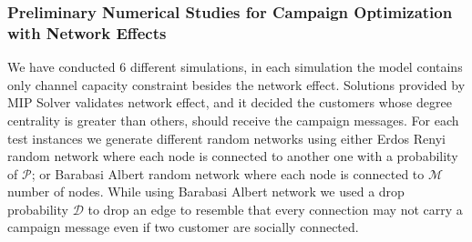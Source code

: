 \documentclass[11pt]{article}
\begin{document}
\subsubsection{Preliminary Numerical Studies for Campaign Optimization with Network Effects}
We have conducted 6 different simulations, in each simulation the model contains only channel capacity constraint besides the network effect. Solutions provided by MIP Solver validates network effect, and it decided the customers whose degree centrality is greater than others, should receive the campaign messages. For each test instances we generate different random networks using either Erdos Renyi random network where each node is connected to another one with a probability of ${\mathcal{P}}$; or Barabasi Albert random network where each node is connected to ${\mathcal{M}}$ number of nodes. While using Barabasi Albert network we used a drop probability ${\mathcal{D}}$ to drop an edge to resemble that every connection may not carry a campaign message even if two customer are socially connected.\\
\end{document}
